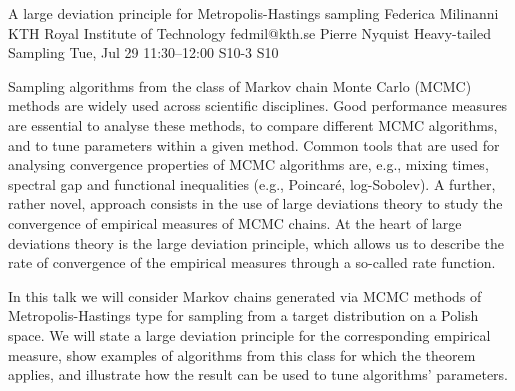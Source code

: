 \begin{talk}
  {A large deviation principle for Metropolis-Hastings sampling}%
  {Federica Milinanni}%
  {KTH Royal Institute of Technology}%
  {fedmil@kth.se}%
  {Pierre Nyquist}%
  {Heavy-tailed Sampling}%
  {Tue, Jul 29 11:30–12:00}%
  {S10-3}%
  {S10}%
				
			
			
Sampling algorithms from the class of Markov chain Monte Carlo (MCMC) methods are widely used across scientific disciplines. Good performance measures are essential to analyse these methods, to compare different MCMC algorithms, and to tune parameters within a given method. Common tools that are used for analysing convergence properties of MCMC algorithms are, e.g., mixing times, spectral gap and functional inequalities (e.g., Poincaré, log-Sobolev). A further, rather novel, approach consists in the use of large deviations theory to study the convergence of empirical measures of MCMC chains. At the heart of large deviations theory is the large deviation principle, which allows us to describe the rate of convergence of the empirical measures through a so-called rate function.

In this talk we will consider Markov chains generated via MCMC methods of Metropolis-Hastings type for sampling from a target distribution on a Polish space. We will state a large deviation principle for the corresponding empirical measure, show examples of algorithms from this class for which the theorem applies, and illustrate how the result can be used to tune algorithms' parameters.

\medskip

\end{talk}

